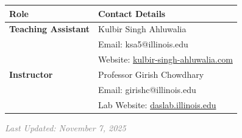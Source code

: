 \documentclass[11pt,a4paper]{article}
\begin{document}
\begin{table}[h!]
\centering
\begin{tabularx}{\textwidth}{lX}
\toprule
\textbf{Role} & \textbf{Contact Details} \\
\midrule
\textbf{Teaching Assistant} & Kulbir Singh Ahluwalia \\
& Email: ksa5@illinois.edu \\
& Website: \href{https://kulbir-singh-ahluwalia.com/}{kulbir-singh-ahluwalia.com} \\
\midrule
\textbf{Instructor} & Professor Girish Chowdhary \\
& Email: girishc@illinois.edu \\
& Lab Website: \href{http://daslab.illinois.edu}{daslab.illinois.edu} \\
\bottomrule
\end{tabularx}
\end{table}

\vfill
\begin{center}
\textcolor{gray}{\textit{Last Updated: November 7, 2025}}
\end{center}
\end{document}
